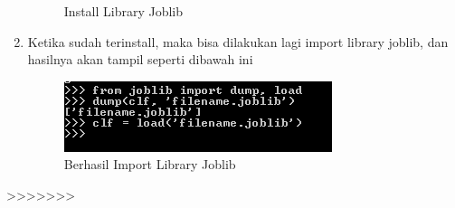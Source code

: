 \begin{enumerate}
\begin{figure}
\begin{center}
\caption{Install Library Joblib}
\end{center}
\end{figure}
\item
Ketika sudah terinstall, maka bisa dilakukan lagi import library joblib, dan hasilnya akan tampil seperti dibawah ini
\begin{figure}
\begin{center}
\includegraphics[scale=1]{figures/hasil3.png}
\caption{Berhasil Import Library Joblib}
\end{center}
\end{figure}
\end{enumerate}




>>>>>>> 
